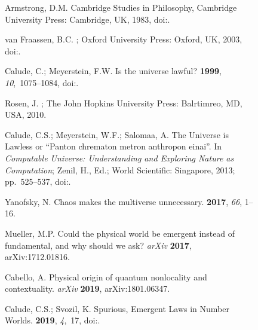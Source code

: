 \documentclass[entropy,article,accept,oneauthor,pdftex]{Definitions/mdpi}
\begin{document}
\begin{figure}[H]
\begin{thebibliography}{999}
Armstrong, D.M.
 Cambridge Studies in Philosophy, Cambridge University Press: Cambridge, UK, 1983, doi:{\href{https://doi.org/10.1017/CBO9781139171700}{}}.

van Fraassen, B.C.
; Oxford University Press: Oxford, UK, 2003, doi:{\href{https://doi.org/10.1093/0198248601.001.0001}{}}.%

Calude, C.; Meyerstein, F.W.
\newblock Is the universe lawful?
 {\bf 1999}, {\em 10},~1075--1084, doi:{\href{https://doi.org/10.1016/S0960-0779(98)00145-3}{}}.

Rosen, J.
; The John Hopkins University Press: Balrtimreo, MD, USA, 2010.

Calude, C.S.; Meyerstein, W.F.; Salomaa, A.
\newblock The Universe is Lawless or ``Panton chrematon metron anthropon
  einai''. In {\em Computable Universe: {U}nderstanding and Exploring Nature as Computation}; Zenil, H., Ed.; World Scientific: Singapore, 2013; pp.~525--537, doi:{\href{https://doi.org/10.1142/9789814374309\_0026}{}}.

Yanofsky, N.
\newblock Chaos makes the multiverse unnecessary.
 {\bf 2017}, \emph{66}, 1--16.

Mueller, M.P.
\newblock Could the physical world be emergent instead of fundamental, and why
  should we ask? \emph{arXiv} \textbf{2017}, arXiv:1712.01816.

Cabello, A.
\newblock Physical origin of quantum nonlocality and contextuality. \emph{arXiv} \textbf{2019}, arXiv:1801.06347.

Calude, C.S.; Svozil, K.
\newblock Spurious, Emergent Laws in Number Worlds.
 {\bf 2019}, {\em 4},~17, doi:{\href{https://doi.org/10.3390/philosophies4020017}{}}.


\end{thebibliography}
\end{figure}
\end{document}

